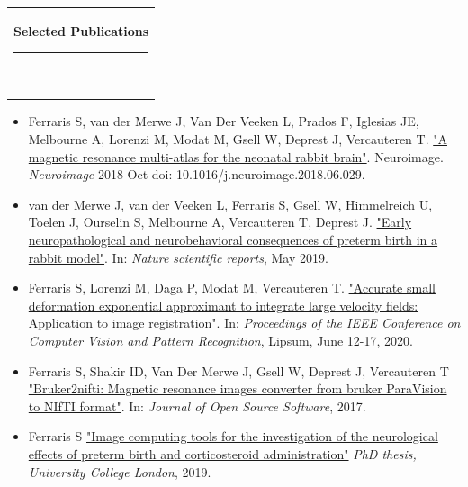 \documentclass[10pt,A4,english]{article}
\newcommand{\mpwidth}{\linewidth-\fboxsep-\fboxsep}
\newcommand{\cvtext}[1] {
	\begin{tabular*}{1\mpwidth}{p{0.98\mpwidth}}
		\parbox{1\mpwidth}{#1}
	\end{tabular*}
}
\newlength{\barw}
\newcommand{\cvsection}[1] {
	\vspace{14pt}
	\settowidth{\barw}{\textbf{\LARGE #1}}
	\cvtext{
		\textbf{\LARGE{\textcolor{darkcol}{#1}}}\\[-4pt]
		\textcolor{accentcol}{ \rule{\barw}{1.5pt} } \\
	}
}
\newcommand{\cvevent}[7] {
	
	\parbox{\mpwidth}{
		\begin{tabular*}{1\mpwidth}{p{0.65\mpwidth}  r}
	 		\textcolor{black}{\textbf{#2}} & \colorbox{accentcol}{\makebox[0.35\mpwidth]{\textcolor{white}{\textbf{#1}}}} \\
			\textcolor{maincol}{#3} & \\
		\end{tabular*}\\[8pt]
	
		\ifthenelse{\isempty{#4}}{}{
			\cvtext{#4}\\
		}
	}
	\vspace{14pt}
}
\begin{document}
\begin{paracol}{2}
\begin{rightcolumn}



\cvsection{Selected Publications}

\begin{itemize}[leftmargin=*]
\item Ferraris S, van der Merwe J, Van Der Veeken L, Prados F, Iglesias JE, Melbourne A, Lorenzi M, Modat M, Gsell W, Deprest J, Vercauteren T. 
\href{https://www.ncbi.nlm.nih.gov/pmc/articles/PMC6203700/}{"A magnetic resonance multi-atlas for the neonatal rabbit brain"}.
Neuroimage. \textit{Neuroimage} 2018 Oct doi: 10.1016/j.neuroimage.2018.06.029.
\item van der Merwe J, van der Veeken L, Ferraris S, Gsell W, Himmelreich U, Toelen J, Ourselin S, Melbourne A, Vercauteren T, Deprest J.  
\href{https://www.nature.com/articles/s41598-019-39922-8}{"Early neuropathological and neurobehavioral consequences of preterm birth in a rabbit model"}. 
In: \textit{Nature scientific reports}, May 2019.
\item Ferraris S, Lorenzi M, Daga P, Modat M, Vercauteren T. 
\href{https://ieeexplore.ieee.org/document/7789554}{"Accurate small deformation exponential approximant to integrate large velocity fields: Application to image registration"}. 
In: \textit{Proceedings of the IEEE Conference on Computer Vision and Pattern Recognition}, Lipsum, June 12-17, 2020.
\item Ferraris S, Shakir ID, Van Der Merwe J, Gsell W, Deprest J, Vercauteren T 
\href{https://joss.theoj.org/papers/10.21105/joss.00354}{"Bruker2nifti: Magnetic resonance images converter from bruker ParaVision to NIfTI format"}. 
In: \textit{Journal of Open Source Software}, 2017.
\item Ferraris S 
\href{https://discovery.ucl.ac.uk/id/eprint/10072833/}{"Image computing tools for the investigation of the neurological effects of preterm birth and corticosteroid administration"} 
\textit{PhD thesis, University College London}, 2019.



\end{itemize}
\end{rightcolumn}
\end{paracol}
\end{document}
